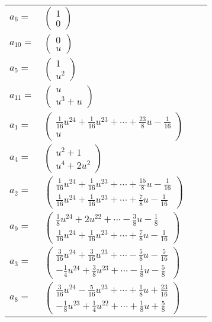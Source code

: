 \documentclass[1p]{elsarticle_modified}
\theoremstyle{definition}
\begin{document}
\begin{tabular}{m{7pt} m{180pt} m{7pt} m{180pt} }
\flushright $a_{6}=$&$\begin{pmatrix}1\\0\end{pmatrix}$ \\
\flushright $a_{10}=$&$\begin{pmatrix}0\\u\end{pmatrix}$ \\
\flushright $a_{5}=$&$\begin{pmatrix}1\\u^2\end{pmatrix}$ \\
\flushright $a_{11}=$&$\begin{pmatrix}u\\u^3+u\end{pmatrix}$ \\
\flushright $a_{1}=$&$\begin{pmatrix}\frac{1}{16} u^{24}+\frac{1}{16} u^{23}+\cdots+\frac{23}{8} u-\frac{1}{16}\\u\end{pmatrix}$ \\
\flushright $a_{4}=$&$\begin{pmatrix}u^2+1\\u^4+2 u^2\end{pmatrix}$ \\
\flushright $a_{2}=$&$\begin{pmatrix}\frac{1}{16} u^{24}+\frac{1}{16} u^{23}+\cdots+\frac{15}{8} u-\frac{1}{16}\\\frac{1}{16} u^{24}+\frac{1}{16} u^{23}+\cdots+\frac{7}{8} u-\frac{1}{16}\end{pmatrix}$ \\
\flushright $a_{9}=$&$\begin{pmatrix}\frac{1}{8} u^{24}+2 u^{22}+\cdots-\frac{3}{8} u-\frac{1}{8}\\\frac{1}{16} u^{24}+\frac{1}{16} u^{23}+\cdots+\frac{7}{8} u-\frac{1}{16}\end{pmatrix}$ \\
\flushright $a_{3}=$&$\begin{pmatrix}\frac{3}{16} u^{24}+\frac{3}{16} u^{23}+\cdots-\frac{5}{8} u-\frac{5}{16}\\-\frac{1}{4} u^{24}+\frac{3}{8} u^{23}+\cdots-\frac{1}{8} u-\frac{5}{8}\end{pmatrix}$ \\
\flushright $a_{8}=$&$\begin{pmatrix}\frac{3}{16} u^{24}-\frac{5}{16} u^{23}+\cdots+\frac{1}{8} u+\frac{23}{16}\\-\frac{1}{8} u^{23}+\frac{1}{4} u^{22}+\cdots+\frac{1}{8} u+\frac{5}{8}\end{pmatrix}$ \\

\end{tabular}
\end{document}
